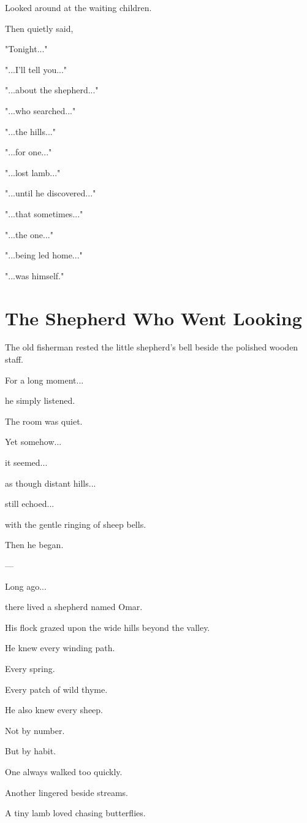 \documentclass[12pt,openany]{book}
\begin{document}
Looked around at the waiting children.

Then quietly said,

"Tonight..."

"...I'll tell you..."

"...about the shepherd..."

"...who searched..."

"...the hills..."

"...for one..."

"...lost lamb..."

"...until he discovered..."

"...that sometimes..."

"...the one..."

"...being led home..."

"...was himself."
\section*{The Shepherd Who Went Looking}

The old fisherman rested the little shepherd's bell beside the polished wooden staff.

For a long moment...

he simply listened.

The room was quiet.

Yet somehow...

it seemed...

as though distant hills...

still echoed...

with the gentle ringing of sheep bells.

Then he began.

---

Long ago...

there lived a shepherd named Omar.

His flock grazed upon the wide hills beyond the valley.

He knew every winding path.

Every spring.

Every patch of wild thyme.

He also knew every sheep.

Not by number.

But by habit.

One always walked too quickly.

Another lingered beside streams.

A tiny lamb loved chasing butterflies.
\end{document}
